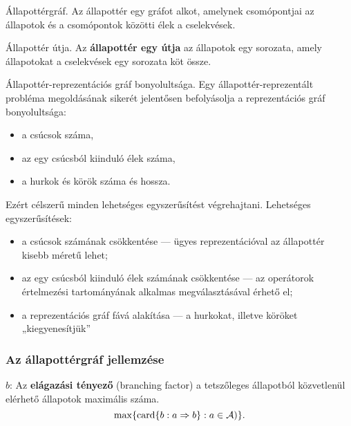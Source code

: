 \begin{definicio}
    Állapottérgráf.
    Az állapottér egy gráfot alkot,
    amelynek csomópontjai az állapotok és a csomópontok közötti élek a
    cselekvések.
\end{definicio}

\begin{definicio}
    Állapottér útja.
    Az \textbf{állapottér egy útja} az állapotok egy sorozata, amely
    állapotokat a cselekvések egy sorozata köt össze.
\end{definicio}

\begin{definicio}
    Állapottér-reprezentációs gráf bonyolultsága.  Egy állapottér-reprezentált
    probléma megoldásának sikerét jelentősen befolyásolja a reprezentációs gráf
    bonyolultsága:

    \begin{itemize}
        \item a csúcsok száma,
        \item az egy csúcsból kiinduló élek száma,
        \item a hurkok és körök száma és hossza.
    \end{itemize}

    Ezért célszerű minden lehetséges egyszerűsítést végrehajtani. Lehetséges
    egyszerűsítések:

    \begin{itemize}
        \item a csúcsok számának csökkentése — ügyes reprezentációval az
            állapottér kisebb méretű lehet;
        \item az egy csúcsból kiinduló élek számának csökkentése — az
            operátorok értelmezési tartományának alkalmas megválasztásával
            érhető el;
        \item a reprezentációs gráf fává alakítása — a hurkokat, illetve
            köröket „kiegyenesítjük”
    \end{itemize}
\end{definicio}

\subsubsection{Az állapottérgráf jellemzése}

$b$: Az {\bf elágazási tényező} (branching factor) a tetszőleges
állapotból közvetlenül elérhető állapotok maximális száma. \[
\max \{\operatorname{card} \{b:a \Rightarrow b\} : a \in \mathcal{A})\}
.\]

